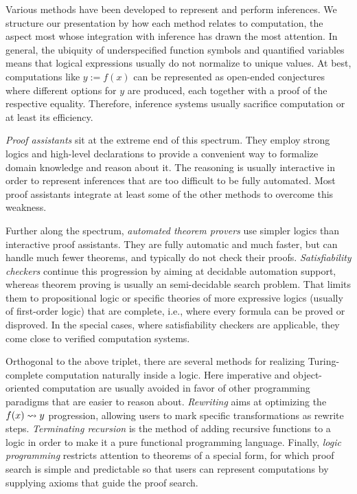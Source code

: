 Various methods have been developed to represent and perform inferences.
We structure our presentation by how each method relates to computation, the aspect most whose integration with inference has drawn the most attention.
In general, the ubiquity of underspecified function symbols and quantified variables means that logical expressions usually do not normalize to unique values.
At best, computations like $y:=f(x)$ can be represented as open-ended conjectures where different options for $y$ are produced, each together with a proof of the respective equality.
Therefore, inference systems usually sacrifice computation or at least its efficiency.

\emph{Proof assistants} sit at the extreme end of this spectrum.
They employ strong logics and high-level declarations to provide a convenient way to formalize domain knowledge and reason about it.
The reasoning is usually interactive in order to represent inferences that are too difficult to be fully automated.
Most proof assistants integrate at least some of the other methods to overcome this weakness.

Further along the spectrum, \emph{automated theorem provers} use simpler logics than interactive proof assistants.
They are fully automatic and much faster, but can handle much fewer theorems, and typically do not check their proofs.
\emph{Satisfiability checkers} continue this progression by aiming at decidable automation support, whereas theorem proving is usually an semi-decidable search problem.
That limits them to propositional logic or specific theories of more expressive logics (usually of first-order logic) that are complete, i.e., where every formula can be proved or disproved.
In the special cases, where satisfiability checkers are applicable, they come close to verified computation systems.

Orthogonal to the above triplet, there are several methods for realizing Turing-complete computation naturally inside a logic.
Here imperative and object-oriented computation are usually avoided in favor of other programming paradigms that are easier to reason about.
\emph{Rewriting} aims at optimizing the $f(x)\rightsquigarrow y$ progression, allowing users to mark specific transformations as rewrite steps.
\emph{Terminating recursion} is the method of adding recursive functions to a logic in order to make it a pure functional programming language.
Finally, \emph{logic programming} restricts attention to theorems of a special form, for which proof search is simple and predictable so that users can represent computations by supplying axioms that guide the proof search.
